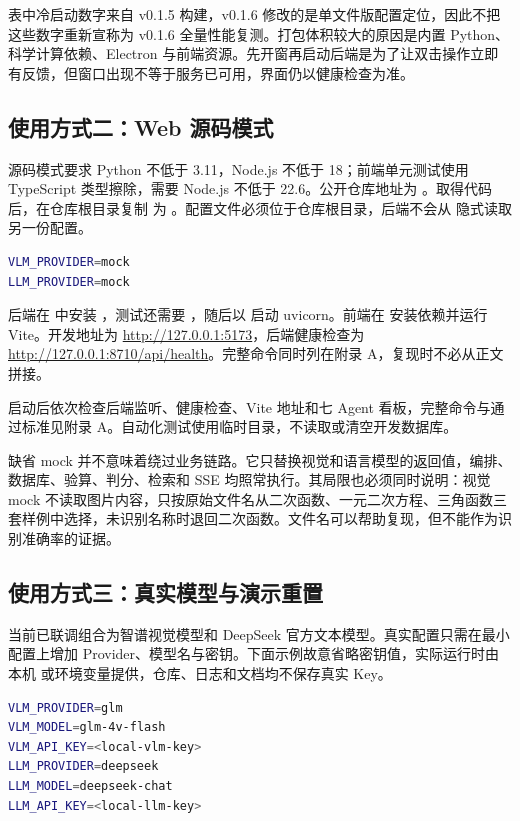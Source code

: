 表中冷启动数字来自 v0.1.5 构建，v0.1.6 修改的是单文件版配置定位，因此不把这些数字重新宣称为 v0.1.6 全量性能复测。打包体积较大的原因是内置 Python、科学计算依赖、Electron 与前端资源。先开窗再启动后端是为了让双击操作立即有反馈，但窗口出现不等于服务已可用，界面仍以健康检查为准。

\subsection{使用方式二：Web 源码模式}

源码模式要求 Python 不低于 3.11，Node.js 不低于 18；前端单元测试使用 TypeScript 类型擦除，需要 Node.js 不低于 22.6。公开仓库地址为 \repo。取得代码后，在仓库根目录复制  为 。配置文件必须位于仓库根目录，后端不会从  隐式读取另一份配置。

\begin{lstlisting}[language=bash,caption={零密钥最小配置（仓库根目录的 .env）},label={lst:mock-env}]
VLM_PROVIDER=mock
LLM_PROVIDER=mock
\end{lstlisting}

后端在  中安装 ，测试还需要 ，随后以  启动 uvicorn。前端在  安装依赖并运行 Vite。开发地址为 \url{http://127.0.0.1:5173}，后端健康检查为 \url{http://127.0.0.1:8710/api/health}。完整命令同时列在附录 A，复现时不必从正文拼接。

启动后依次检查后端监听、健康检查、Vite 地址和七 Agent 看板，完整命令与通过标准见附录 A。自动化测试使用临时目录，不读取或清空开发数据库。

缺省 mock 并不意味着绕过业务链路。它只替换视觉和语言模型的返回值，编排、数据库、验算、判分、检索和 SSE 均照常执行。其局限也必须同时说明：视觉 mock 不读取图片内容，只按原始文件名从二次函数、一元二次方程、三角函数三套样例中选择，未识别名称时退回二次函数。文件名可以帮助复现，但不能作为识别准确率的证据。

\subsection{使用方式三：真实模型与演示重置}

当前已联调组合为智谱视觉模型和 DeepSeek 官方文本模型。真实配置只需在最小配置上增加 Provider、模型名与密钥。下面示例故意省略密钥值，实际运行时由本机  或环境变量提供，仓库、日志和文档均不保存真实 Key。

\begin{lstlisting}[language=bash,caption={真实 Provider 配置示例（密钥仅留占位）},label={lst:real-env}]
VLM_PROVIDER=glm
VLM_MODEL=glm-4v-flash
VLM_API_KEY=<local-vlm-key>
LLM_PROVIDER=deepseek
LLM_MODEL=deepseek-chat
LLM_API_KEY=<local-llm-key>
\end{lstlisting}

